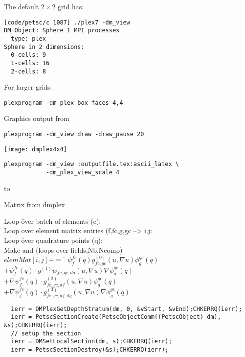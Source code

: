 The default $2\times 2$ grid has:
\begin{verbatim}
[code/petsc/c 1087] ./plex7 -dm_view
DM Object: Sphere 1 MPI processes
  type: plex
Sphere in 2 dimensions:
  0-cells: 9
  1-cells: 16
  2-cells: 8
\end{verbatim}

For larger grids:
\begin{verbatim}
plexprogram -dm_plex_box_faces 4,4
\end{verbatim}

\begin{multicols}{2}
  Graphics output from
\begin{verbatim}
plexprogram -dm_view draw -draw_pause 20
\end{verbatim}
\vfill
\columnbreak
\texttt{[image: dmplex4x4]}
\end{multicols}

\begin{verbatim}
plexprogram -dm_view :outputfile.tex:ascii_latex \
            -dm_plex_view_scale 4
\end{verbatim}

\hbox to \textwidth {

\hfil

}

 {Matrix from dmplex}

\begin{tabbing}
  Loop \=over batch of elements (e):\\
  \>Loop \=over element matrix entries (f,fc,g,gc --> i,j:\\
  \>\>Loop \=over quadrature points (q):\\
  \>\>\>Make  and  (loops over fields,Nb,Ncomp)\\
  \>\>\>$elemMat[i,j] += $ \= $\psi^{fc}_f(q) g^{(0)}_{fc,gc}(u, \nabla u) \phi^{gc}_g(q)$\\
  \>\>\>\> $+ \psi^{fc}_f(q) \cdot g^{(1)}w_{fc,gc,dg}(u, \nabla u) \nabla\phi^{gc}_g(q)$\\
  \>\>\>\> $+ \nabla\psi^{fc}_f(q) \cdot g^{(2)}_{fc,gc,df}(u, \nabla u) \phi^{gc}_g(q)$\\
  \>\>\>\> $+ \nabla\psi^{fc}_f(q) \cdot g^{(3)}_{fc,gc,df,dg}(u, \nabla u) \nabla\phi^{gc}_g(q)$\\
\end{tabbing}

\begin{lstlisting}
  ierr = DMPlexGetDepthStratum(dm, 0, &vStart, &vEnd);CHKERRQ(ierr);
  ierr = PetscSectionCreate(PetscObjectComm((PetscObject) dm), &s);CHKERRQ(ierr);
  // setup the section
  ierr = DMSetLocalSection(dm, s);CHKERRQ(ierr);
  ierr = PetscSectionDestroy(&s);CHKERRQ(ierr);
\end{lstlisting}

